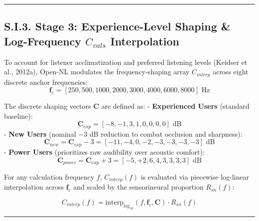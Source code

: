 \documentclass[
  12pt,
]{article}
\begin{document}
\begin{center}\rule{0.5\linewidth}{0.5pt}\end{center}

\subsection{\texorpdfstring{S.I.3. Stage 3: Experience-Level Shaping \&
Log-Frequency \(C_{vals}\)
Interpolation}{S.I.3. Stage 3: Experience-Level Shaping \& Log-Frequency C\_\{vals\} Interpolation}}\label{s.i.3.-stage-3-experience-level-shaping-log-frequency-c_vals-interpolation}

To account for listener acclimatization and preferred listening levels
(Keidser et al., 2012a), Open-NL modulates the frequency-shaping array
\(C_{interp}\) across eight discrete anchor frequencies:
\begin{equation}
\mathbf{f}_c = [250, 500, 1000, 2000, 3000, 4000, 6000, 8000]\text{ Hz}
\end{equation}

The discrete shaping vectors \(\mathbf{C}\) are defined as: -
\textbf{Experienced Users} (standard baseline): \begin{equation}
  \mathbf{C}_{exp} = [-8, -1, 3, 1, 0, 0, 0, 0]\text{ dB}
  \end{equation} - \textbf{New Users} (nominal \(-3\) dB reduction to
combat occlusion and sharpness): \begin{equation}
  \mathbf{C}_{new} = \mathbf{C}_{exp} - 3 = [-11, -4, 0, -2, -3, -3, -3, -3]\text{ dB}
  \end{equation} - \textbf{Power Users} (prioritizes raw audibility over
acoustic comfort): \begin{equation}
  \mathbf{C}_{power} = \mathbf{C}_{exp} + 3 = [-5, +2, 6, 4, 3, 3, 3, 3]\text{ dB}
  \end{equation}

For any calculation frequency \(f\), \(C_{interp}(f)\) is evaluated via
piecewise log-linear interpolation across \(\mathbf{f}_c\) and scaled by
the sensorineural proportion \(R_{sn}(f)\):

\begin{equation}
C_{interp}(f) = \text{interp}_{\log_{10}}\left(f, \mathbf{f}_c, \mathbf{C}\right) \cdot R_{sn}(f)
\end{equation}

\begin{center}\rule{0.5\linewidth}{0.5pt}\end{center}
\end{document}
